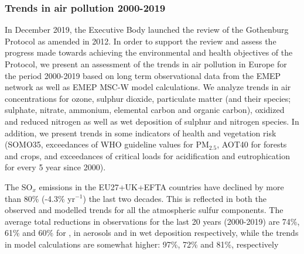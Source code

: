 

\subsubsection*{Trends in air pollution 2000-2019}
In December 2019, the Executive Body launched the review of the Gothenburg Protocol as amended in 2012. In order to support the review and assess the progress made towards achieving the environmental and health objectives of the Protocol, we present an assessment of the trends in air pollution in Europe for the period 2000-2019 based on long term observational data from the EMEP network as well as EMEP MSC-W model calculations.
We analyze trends in air concentrations for ozone, sulphur dioxide, particulate matter (and their species; sulphate, nitrate, ammonium, elemental carbon and organic carbon), oxidized and reduced nitrogen as well as wet deposition of sulphur and nitrogen species. In addition, we present trends in some indicators of health and vegetation risk (SOMO35, exceedances of WHO guideline values for PM$_{2.5}$, AOT40 for forests and crops, and exceedances of critical loads for acidification and eutrophication for every 5 year since 2000).

The SO$_x$ emissions in the EU27+UK+EFTA countries have declined by more than 80\% (-4.3\% yr$^{-1}$) the last two decades. This is reflected in both the observed and modelled trends for all the atmospheric sulfur components. The average total reductions in observations for the last 20 years (2000-2019) are 74\%, 61\% and 60\% for \soii, \soiv in aerosols and in wet deposition respectively, while the trends in model calculations are somewhat higher: 97\%, 72\% and 81\%, respectively

